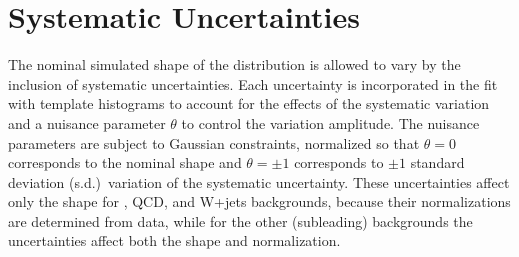 \chapter{Systematic Uncertainties}

The nominal simulated shape of the \Nb distribution is allowed to vary by the inclusion of systematic uncertainties.
Each uncertainty is incorporated in the fit with template \Nb histograms to account for the effects of the systematic variation and a nuisance parameter $\theta$ to control the variation amplitude.
The nuisance parameters are subject to Gaussian constraints, normalized so that $\theta=0$ corresponds to the nominal \Nb shape and $\theta=\pm1$ corresponds to $\pm1$ standard deviation (s.d.)\ variation of the systematic uncertainty.
These uncertainties affect only the \Nb shape for \ttbar, QCD, and W+jets backgrounds, because their normalizations are determined from data, while for the other (subleading) backgrounds the uncertainties affect both the \Nb shape and normalization.

